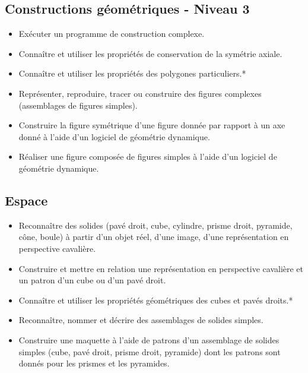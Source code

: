 \documentclass[a4paper,12pt,fleqn]{article}		
\begin{document}
\subsection*{Constructions géométriques - Niveau 3}

\begin{itemize}
	\item {}Exécuter un programme de construction complexe.
	\item {}Connaître et utiliser les propriétés de conservation de la symétrie axiale.
	\item {}Connaître et utiliser les propriétés des polygones particuliers.*
	\item {}Représenter, reproduire, tracer ou construire des figures complexes (assemblages de figures simples).
	\item {}Construire la figure symétrique d’une figure donnée par rapport à un axe donné à l’aide d’un logiciel de géométrie dynamique.
	\item {}Réaliser une figure composée de figures simples à l’aide d’un logiciel de géométrie dynamique.
\end{itemize}

\subsection*{Espace}

\begin{itemize}
	\item {}Reconnaître des solides (pavé droit, cube, cylindre, prisme droit, pyramide, cône, boule) à partir d’un objet réel, d’une image, d’une représentation en perspective cavalière.
	\item {}Construire et mettre en relation une représentation en perspective cavalière et un patron d’un cube ou d’un pavé droit.
	\item {}Connaître et utiliser les propriétés géométriques des cubes et pavés droits.*
	\item {}Reconnaître, nommer et décrire des assemblages de solides simples.
	\item {}Construire une maquette à l’aide de patrons d’un assemblage de solides simples (cube, pavé droit, prisme droit, pyramide) dont les patrons sont donnés pour les prismes et les pyramides.
\end{itemize}
\end{document}
